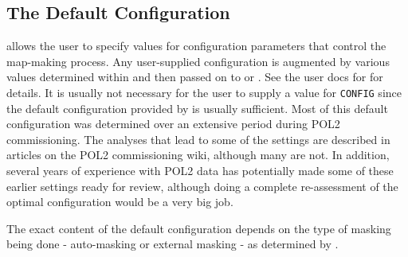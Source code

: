 \documentclass[twoside,11pt]{starlink}
\begin{document}
\subsection{The Default \ptmap Configuration}
 allows the user to specify values for configuration
parameters that control the map-making process. Any user-supplied
configuration is augmented by various values determined within \ptmap and
then passed on to \mmap or \sloop. See the user docs for  for
details. It is usually not necessary for the user to supply a value for
\texttt{CONFIG} since the default configuration provided by \ptmap
is usually sufficient. Most of this default configuration was determined over
an extensive period during POL2 commissioning. The analyses that lead to
some of the settings are described in articles on the POL2 commissioning
wiki, although many are not. In addition, several years of experience
with POL2 data has potentially made some of these earlier settings ready
for review, although doing a complete re-assessment of the optimal
configuration would be a very big job.

The exact content of the default configuration depends on the type of
masking being done - auto-masking or external masking - as determined by
.
\end{document}
